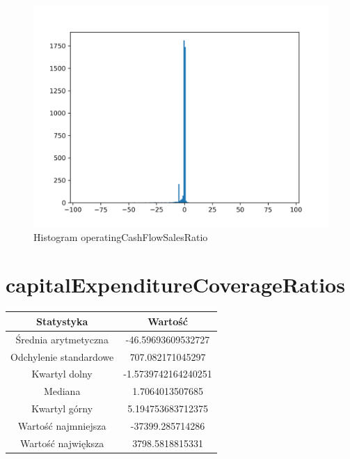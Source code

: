 \documentclass{article}
\begin{document}
\begin{figure}[h!]
    \includegraphics[width=\linewidth]{variables/operatingCashFlowSalesRatio.png}
    \caption{Histogram operatingCashFlowSalesRatio }
\end{figure}\section{ capitalExpenditureCoverageRatios }

\begin{center}
    \begin{tabular}{|c | c|} 
    \hline
    Statystyka & Wartość \\
    \hline\hline
    Średnia arytmetyczna & -46.59693609532727 \\ 
    \hline
    Odchylenie standardowe & 707.082171045297 \\
    \hline
    Kwartyl dolny & -1.5739742164240251 \\
    \hline
    Mediana & 1.7064013507685 \\
    \hline
    Kwartyl górny & 5.194753683712375 \\
    \hline
    Wartość najmniejsza & -37399.285714286 \\
    \hline
    Wartość największa & 3798.5818815331 \\
    \hline
   \end{tabular}
\end{center}
\end{document}

